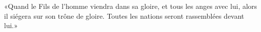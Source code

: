 \encetemps \jesusdisciples
«Quand le Fils de l’homme viendra dans sa gloire, et tous les anges avec lui,
	alors il siégera sur son trône de gloire.
Toutes les nations seront rassemblées devant lui.»
